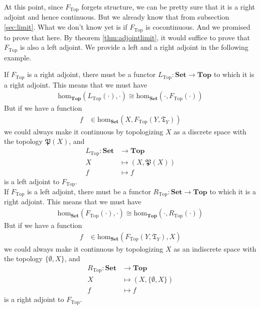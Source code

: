 At this point, since $F_{\mathrm{Top}}$ forgets structure, we can be pretty sure that it is a right adjoint and hence continuous.
But we already know that from subsection \ref{sec:limit}.
What we don't know yet is if $F_{\mathrm{Top}}$ is cocontinuous.
And we promised to prove that here.
By theorem \ref{thm:adjointlimit}, it would suffice to prove that $F_{\mathrm{Top}}$ is also a left adjoint.
We provide a left and a right adjoint in the following example.
\\
\begin{exa}
\label{exa:ftopadjoints}
If $F_{\mathrm{Top}}$ is a right adjoint, there must be a functor $L_{\mathrm{Top}} \colon \mathbf{Set} \rightarrow \mathbf{Top}$ to which it is a right adjoint.
This means that we must have
\begin{align*}
  \mathrm{hom}_{\mathbf{Top}}(L_{\mathrm{Top}}(\cdot),\cdot)
  \cong
  \mathrm{hom}_{\mathbf{Set}}(\cdot,F_{\mathrm{Top}}(\cdot))
\end{align*}
But if we have a function
\begin{align*}
  f
  &\in
  \mathrm{hom}_{\mathbf{Set}}(X,F_{\mathrm{Top}}(Y,\mathfrak{T}_{Y}))
\end{align*}
we could always make it continuous by topologizing $X$ as a discrete space with the topology $\mathfrak{P}(X)$, and
\begin{align*}
  L_{\mathrm{Top}}
  \colon
  \mathbf{Set}
  &\rightarrow
  \mathbf{Top}
  \\
  X
  &\mapsto
  (X,\mathfrak{P}(X))
  \\
  f
  &\mapsto
  f
\end{align*}
is a left adjoint to $F_{\mathrm{Top}}$.
\\
If $F_{\mathrm{Top}}$ is a left adjoint, there must be a functor $R_{\mathrm{Top}} \colon \mathbf{Set} \rightarrow \mathbf{Top}$ to which it is a right adjoint.
This means that we must have
\begin{align*}
  \mathrm{hom}_{\mathbf{Set}}(F_{\mathrm{Top}}(\cdot),\cdot)
  \cong
  \mathrm{hom}_{\mathbf{Top}}(\cdot,R_{\mathrm{Top}}(\cdot))
\end{align*}
But if we have a function
\begin{align*}
  f
  &\in
  \mathrm{hom}_{\mathbf{Set}}(F_{\mathrm{Top}}(Y,\mathfrak{T}_{Y}),X)
\end{align*}
we could always make it continuous by topologizing $X$ as an indiscrete space with the topology $\lbrace \emptyset,X \rbrace$, and
\begin{align*}
  R_{\mathrm{Top}}
  \colon
  \mathbf{Set}
  &\rightarrow
  \mathbf{Top}
  \\
  X
  &\mapsto
  (X,\lbrace \emptyset,X \rbrace)
  \\
  f
  &\mapsto
  f
\end{align*}
is a right adjoint to $F_{\mathrm{Top}}$.
\end{exa}
